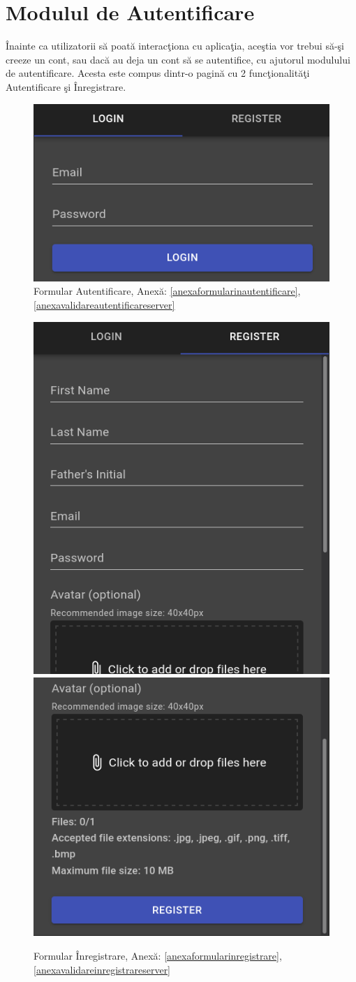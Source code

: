 \documentclass[12pt, a4paper, oneside, romanian]{teza-upb}
\begin{document}
\section{Modulul de Autentificare}

Înainte ca utilizatorii să poată interacţiona cu aplicaţia, aceştia vor trebui să-şi creeze un cont, sau dacă au deja un cont să se autentifice, cu ajutorul modulului de autentificare. Acesta este compus dintr-o pagină cu 2 funcţionalităţi Autentificare şi Înregistrare.

\begin{figure}[H]
\centering
\includegraphics*[width=0.5\columnwidth]{auth-login}
\caption{Formular Autentificare, Anexă: \ref{anexaformularinautentificare}, \ref{anexavalidareautentificareserver}}
\label{formular-autentificare}
\end{figure}

\begin{figure}[H]
\centering
\includegraphics*[width=0.45\columnwidth]{auth-register1}
\includegraphics*[width=0.45\columnwidth]{auth-register2}
\caption{Formular Înregistrare, Anexă: \ref{anexaformularinregistrare}, \ref{anexavalidareinregistrareserver}}
\label{formular-inregistrare}
\end{figure}
\end{document}
